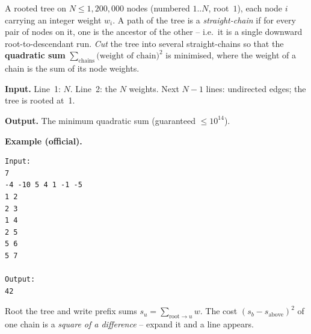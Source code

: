 \begin{problemstatement}
A rooted tree on \(N\le 1{,}200{,}000\) nodes (numbered \(1..N\), root~\(1\)), each
node \(i\) carrying an integer weight \(w_i\).  A path of the tree is a
\emph{straight-chain} if for every pair of nodes on it, one is the ancestor of
the other -- i.e.\ it is a single downward root-to-descendant run.  \emph{Cut} the
tree into several straight-chains so that the \textbf{quadratic sum}
\(\sum_{\text{chains}}\big(\text{weight of chain}\big)^2\) is minimised, where the
weight of a chain is the sum of its node weights.

\textbf{Input.} Line~1: \(N\).  Line~2: the \(N\) weights.  Next \(N-1\) lines:
undirected edges; the tree is rooted at~1.

\textbf{Output.} The minimum quadratic sum (guaranteed \(\le 10^{14}\)).

\textbf{Example (official).}
\begin{verbatim}
Input:
7
-4 -10 5 4 1 -1 -5
1 2
2 3
1 4
2 5
5 6
5 7

Output:
42
\end{verbatim}
\end{problemstatement}

\begin{attemptgate}
Root the tree and write prefix sums \(s_u=\sum_{\text{root}\to u}w\).  The cost
\((s_b-s_{\text{above}})^2\) of one chain is a \emph{square of a difference} --
expand it and a line appears.
\end{attemptgate}

